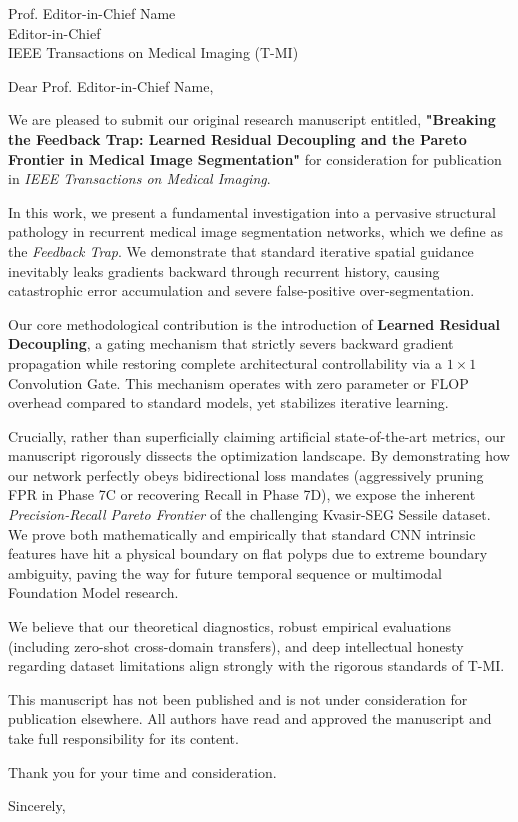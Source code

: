 \documentclass[11pt]{letter}
\begin{document}
\begin{letter}{
    Prof. Editor-in-Chief Name \\
    Editor-in-Chief \\
    IEEE Transactions on Medical Imaging (T-MI)
}

\opening{Dear Prof. Editor-in-Chief Name,}

We are pleased to submit our original research manuscript entitled, \textbf{"Breaking the Feedback Trap: Learned Residual Decoupling and the Pareto Frontier in Medical Image Segmentation"} for consideration for publication in \textit{IEEE Transactions on Medical Imaging}.

In this work, we present a fundamental investigation into a pervasive structural pathology in recurrent medical image segmentation networks, which we define as the \textit{Feedback Trap}. We demonstrate that standard iterative spatial guidance inevitably leaks gradients backward through recurrent history, causing catastrophic error accumulation and severe false-positive over-segmentation. 

Our core methodological contribution is the introduction of \textbf{Learned Residual Decoupling}, a gating mechanism that strictly severs backward gradient propagation while restoring complete architectural controllability via a $1\times1$ Convolution Gate. This mechanism operates with zero parameter or FLOP overhead compared to standard models, yet stabilizes iterative learning.

Crucially, rather than superficially claiming artificial state-of-the-art metrics, our manuscript rigorously dissects the optimization landscape. By demonstrating how our network perfectly obeys bidirectional loss mandates (aggressively pruning FPR in Phase 7C or recovering Recall in Phase 7D), we expose the inherent \textit{Precision-Recall Pareto Frontier} of the challenging Kvasir-SEG Sessile dataset. We prove both mathematically and empirically that standard CNN intrinsic features have hit a physical boundary on flat polyps due to extreme boundary ambiguity, paving the way for future temporal sequence or multimodal Foundation Model research.

We believe that our theoretical diagnostics, robust empirical evaluations (including zero-shot cross-domain transfers), and deep intellectual honesty regarding dataset limitations align strongly with the rigorous standards of T-MI. 

This manuscript has not been published and is not under consideration for publication elsewhere. All authors have read and approved the manuscript and take full responsibility for its content.

Thank you for your time and consideration.

\closing{Sincerely,}

\end{letter}
\end{document}
